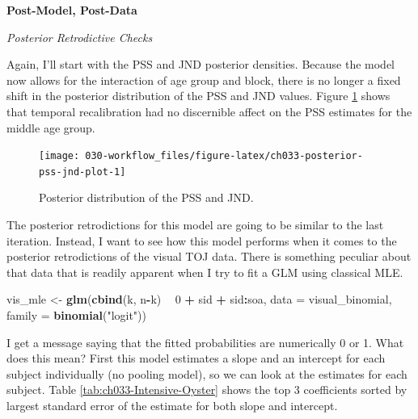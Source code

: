 \documentclass[11pt, oneside, openany]{scrbook}
\newenvironment{Shaded}{\begin{snugshade}}{\end{snugshade}}
\newcommand{\DataTypeTok}[1]{\textcolor[rgb]{0.13,0.29,0.53}{#1}}
\newcommand{\DecValTok}[1]{\textcolor[rgb]{0.00,0.00,0.81}{#1}}
\newcommand{\KeywordTok}[1]{\textcolor[rgb]{0.13,0.29,0.53}{\textbf{#1}}}
\newcommand{\NormalTok}[1]{#1}
\newcommand{\OperatorTok}[1]{\textcolor[rgb]{0.81,0.36,0.00}{\textbf{#1}}}
\newcommand{\StringTok}[1]{\textcolor[rgb]{0.31,0.60,0.02}{#1}}
\begin{document}
\textbf{Post-Model, Post-Data}

\emph{Posterior Retrodictive Checks}

Again, I'll start with the PSS and JND posterior densities. Because the model now allows for the interaction of age group and block, there is no longer a fixed shift in the posterior distribution of the PSS and JND values. Figure \ref{fig:ch033-posterior-pss-jnd-plot} shows that temporal recalibration had no discernible affect on the PSS estimates for the middle age group.

\begin{figure}

{\centering \texttt{[image: 030-workflow\_files/figure-latex/ch033-posterior-pss-jnd-plot-1]} 

}

\caption{Posterior distribution of the PSS and JND.}\label{fig:ch033-posterior-pss-jnd-plot}
\end{figure}

The posterior retrodictions for this model are going to be similar to the last iteration. Instead, I want to see how this model performs when it comes to the posterior retrodictions of the visual TOJ data. There is something peculiar about that data that is readily apparent when I try to fit a GLM using classical MLE.


\begin{Shaded}
\begin{Highlighting}[]
\NormalTok{vis_mle <-}\StringTok{ }\KeywordTok{glm}\NormalTok{(}\KeywordTok{cbind}\NormalTok{(k, n}\OperatorTok{-}\NormalTok{k) }\OperatorTok{~}\StringTok{ }\DecValTok{0} \OperatorTok{+}\StringTok{ }\NormalTok{sid }\OperatorTok{+}\StringTok{ }\NormalTok{sid}\OperatorTok{:}\NormalTok{soa,}
               \DataTypeTok{data =}\NormalTok{ visual_binomial, }\DataTypeTok{family =} \KeywordTok{binomial}\NormalTok{(}\StringTok{"logit"}\NormalTok{))}
\end{Highlighting}
\end{Shaded}


I get a message saying that the fitted probabilities are numerically 0 or 1. What does this mean? First this model estimates a slope and an intercept for each subject individually (no pooling model), so we can look at the estimates for each subject. Table \ref{tab:ch033-Intensive-Oyster} shows the top 3 coefficients sorted by largest standard error of the estimate for both slope and intercept.
\end{document}
